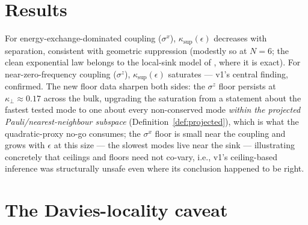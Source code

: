\documentclass[11pt,a4paper]{article}
\theoremstyle{plain}
\theoremstyle{definition}
\theoremstyle{remark}
\newcommand{\eps}{\epsilon}
\newcommand{\ksup}{\kappa_{\sup}}
\newcommand{\kfl}{\kappa_{\perp}}
\begin{document}
\section{Results}

For energy-exchange-dominated coupling ($\sigma^x$), $\ksup(\eps)$ decreases
with separation, consistent with geometric suppression (modestly so at $N=6$;
the clean exponential law belongs to the local-sink model of \cite{HCut},
where it is exact). For near-zero-frequency coupling ($\sigma^z$),
$\ksup(\eps)$ saturates --- v1's central finding, confirmed. The new floor
data sharpen both sides: the $\sigma^z$ floor persists at $\kfl \approx 0.17$
across the bulk, upgrading the saturation from a statement about the fastest
tested mode to one about every non-conserved mode \emph{within the projected
Pauli/nearest-neighbour subspace} (Definition~\ref{def:projected}), which is
what the quadratic-proxy no-go consumes; the $\sigma^x$ floor is small near the coupling and grows with
$\eps$ at this size --- the slowest modes live near the sink --- illustrating
concretely that ceilings and floors need not co-vary, i.e., v1's
ceiling-based inference was structurally unsafe even where its conclusion
happened to be right.

\section{The Davies-locality caveat}\label{sec:caveat}
\end{document}
